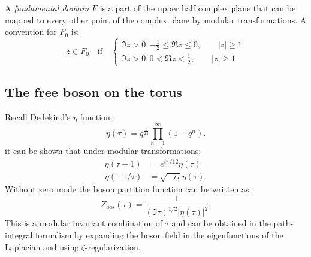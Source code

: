 \documentclass[submission, PhysLectNotes]{SciPost}
\begin{document}
A \emph{fundamental domain} $F$ is a part of the upper half complex plane that can be mapped to every other point of the complex plane by modular transformations. A convention for $F_0$ is:
\begin{equation}
	z\in F_0\quad\text{if}\quad
	\begin{cases}
		\Im z > 0, -\frac{1}{2}\leq \Re z\leq 0, \qquad|z|\geq 1\\
		\Im z > 0, 0< \Re z<\frac{1}{2},\qquad |z|\geq 1
	\end{cases}
\end{equation}
\subsection{The free boson on the torus}
Recall Dedekind's $\eta$ function:
\begin{equation}
	\eta(\tau) = q^{\frac{1}{24}}\prod_{n=1}^\infty (1-q^n).
\end{equation}
it can be shown that under modular transformations:
\begin{align}
	\eta(\tau+1) &= e^{i\pi/12}\eta(\tau)\\
	\eta(-1/\tau) &= \sqrt{-i\tau}\eta(\tau).
\end{align}
Without zero mode the boson partition function can be written as:
\begin{equation}
	Z_{\text{bos}}(\tau) = \frac{1}{(\Im\tau)^{1/2}|\eta(\tau)|^2}.
\end{equation}
This is a modular invariant combination of $\tau$ and can be obtained in the path-integral formalism by expanding the boson field in the eigenfunctions of the Laplacian and using $\zeta$-regularization.
\end{document}
